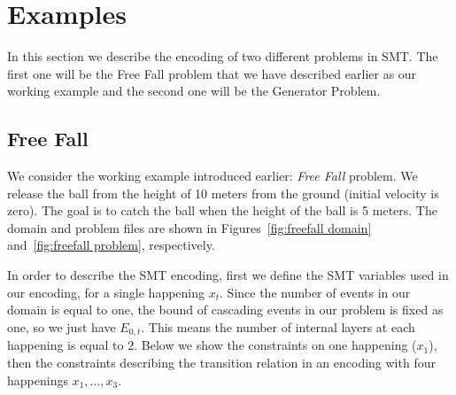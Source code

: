 \section{Examples}\label{sec:example_encodings}

In this section we describe the encoding of two different problems in SMT. The first one will be the Free Fall problem that we have described earlier as our working example and the second one will be the Generator Problem. 

\subsection{Free Fall} \label{sssec:Free_Fall}

We consider the working example introduced earlier: \emph{Free Fall} problem. We release the ball from the height of 10 meters from the ground (initial velocity is zero). The goal is to catch the ball when the height of the ball is 5 meters. The domain and problem files are shown in Figures~\ref{fig:freefall domain} and~\ref{fig:freefall problem}, respectively.

In order to describe the SMT encoding, first we define the SMT variables used in our encoding, for a single happening $x_t$. Since the number of events in our domain is equal to one, the bound of cascading events in our problem is fixed as one, so we just have $E_{0,t}$. This means the number of internal layers at each happening is equal to 2. Below we show the constraints on one happening ($x_1$), then the constraints describing the transition relation in an encoding with four happenings $x_{1}, \ldots, x_3$.

